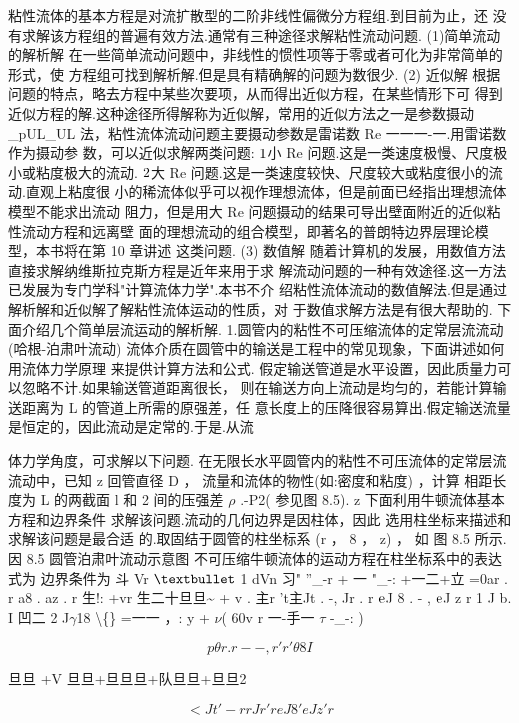 粘性流体的基本方程是对流扩散型的二阶非线性偏微分方程组.到目前为止，还 没有求解该方程组的普遍有效方法.通常有三种途径求解粘性流动问题. (1)简单流动的解析解 在一些简单流动问题中，非线性的惯性项等于零或者可化为非常简单的形式，使 方程组可找到解析解.但是具有精确解的问题为数很少. (2) 近似解 根据问题的特点，略去方程中某些次要项，从而得出近似方程，在某些情形下可 得到近似方程的解.这种途径所得解称为近似解，常用的近似方法之一是参数摄动 \_pUL\_UL 法，粘性流体流动问题主要摄动参数是雷诺数 Re 一一一-一.用雷诺数作为摄动参 数，可以近似求解两类问题: ${\rm 1}$小 Re 问题.这是一类速度极慢、尺度极小或粘度极大的流动. ${\rm 2}$大 Re 问题.这是一类速度较快、尺度较大或粘度很小的流动.直观上粘度很 小的稀流体似乎可以视作理想流体，但是前面已经指出理想流体模型不能求出流动 阻力，但是用大 Re 问题摄动的结果可导出壁面附近的近似粘性流动方程和远离壁 面的理想流动的组合模型，即著名的普朗特边界层理论模型，本书将在第 10 章讲述 这类问题. (3) 数值解 随着计算机的发展，用数值方法直接求解纳维斯拉克斯方程是近年来用于求 解流动问题的一种有效途径.这一方法已发展为专门学科"计算流体力学".本书不介 绍粘性流体流动的数值解法.但是通过解析解和近似解了解粘性流体运动的性质，对 于数值求解方法是有很大帮助的. 下面介绍几个简单层流运动的解析解. 1.圆管内的粘性不可压缩流体的定常层流流动(哈根-泊肃叶流动) 流体介质在圆管中的输送是工程中的常见现象，下面讲述如何用流体力学原理 来提供计算方法和公式. 假定输送管道是水平设置，因此质量力可以忽略不计.如果输送管道距离很长， 则在输送方向上流动是均匀的，若能计算输送距离为 L 的管道上所需的原强差，任 意长度上的压降很容易算出.假定输送流量是恒定的，因此流动是定常的.于是.从流

体力学角度，可求解以下问题. 在无限长水平圆管内的粘性不可压流体的定常层流流动中，已知 z 回管直径 D ， 流量和流体的物性(如:密度和粘度) ，计算 相距长度为 L 的两截面 l 和 2 间的压强差 $\rho$ .-P2( 参见图 8.5). z 下面利用牛顿流体基本方程和边界条件 求解该问题.流动的几何边界是因柱体，因此 选用柱坐标来描述和求解该问题是最合适 的.取固结于圆管的柱坐标系 (r ， 8 ， z) ， 如 图 8.5 所示. 因 8.5 圆管泊肃叶流动示意图 不可压缩牛顿流体的运动方程在柱坐标系中的表达式为 边界条件为 斗 Vr ${\rm •}$ 1 dVn 习" ''\_-r + 一 "\_-: +一二+立 =0ar . r a8 . az . r 生!: +vr 生二十旦旦\textasciitilde{} + v . 主r 't主Jt . -, Jr . r ${\rm e}$J 8 . - , ${\rm e}$J z r 1 J b. I 凹二 2 J$\gamma$18 \textbackslash\{\} =一一 ，: y + $\nu$( 60v r 一-手一 $\tau$ -\_-: )

\[p\theta  r . r -- , r ' r' \theta  8 I\]

旦旦 +V 旦旦+旦旦旦+队旦旦+旦旦2

\[<J t ' -r rJ r ' r eJ8 ' eJ z' r\]

